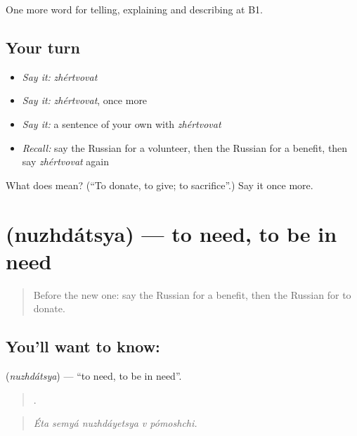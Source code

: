 \begin{grammarlens}[title={What you've built}]
One more word for telling, explaining and describing at B1.
\end{grammarlens}

\subsection*{Your turn}
\begin{itemize}
\raggedright
  \item \emph{Say it:} \emph{zhértvovat}
  \item \emph{Say it:} \emph{zhértvovat}, once more
  \item \emph{Say it:} a sentence of your own with \emph{zhértvovat}
  \item \emph{Recall:} say the Russian for a volunteer, then the Russian for a benefit, then say \emph{zhértvovat} again
\end{itemize}

\begin{tcolorbox}[breakable,colback=teal!4,colframe=teal!35!black,title={Before you move on}]
What does  mean? (\textquotedblleft{}To donate, to give; to sacrifice\textquotedblright{}.) Say it once more.
\end{tcolorbox}
\section[\texorpdfstring{\ru{нуждаться} (nuzhdátsya)}{нуждаться (nuzhdátsya)}]{ (nuzhdátsya) — to need, to be in need}

\label{lesson:RU-C368-nuzhdatsya}



\begin{quote}
Before the new one: say the Russian for a benefit, then the Russian for to donate.
\end{quote}

\subsection*{You'll want to know: }
\textbf{} (\emph{nuzhdátsya}) — \textquotedblleft{}to need, to be in need\textquotedblright{}.

\begin{quote}
    .
\end{quote}

\begin{quote}
\emph{Éta semyá nuzhdáyetsya v pómoshchi.}
\end{quote}

